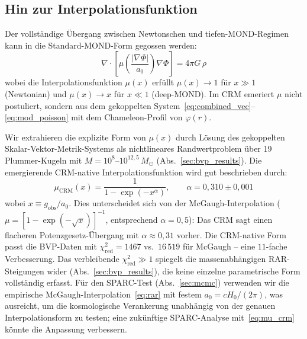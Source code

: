 \documentclass[aps,prd,twocolumn,superscriptaddress,nofootinbib]{revtex4-2}
\begin{document}
\subsection{Hin zur Interpolationsfunktion}
\label{sec:interpolation}

Der vollst\"andige \"Ubergang zwischen Newtonschen und tiefen-MOND-Regimen kann in die Standard-MOND-Form gegossen werden:
\begin{equation}
\nabla\cdot\!\left[\mu\!\left(\frac{|\nabla\Phi|}{a_0}\right)\nabla\Phi\right] = 4\pi G\,\rho
\label{eq:mond_form}
\end{equation}
wobei die Interpolationsfunktion $\mu(x)$ erf\"ullt $\mu(x) \to 1$ f\"ur $x \gg 1$ (Newtonian) und $\mu(x) \to x$ f\"ur $x \ll 1$ (deep-MOND). Im CRM emeriert $\mu$ nicht postuliert, sondern aus dem gekoppelten System~\eqref{eq:combined_vec}--\eqref{eq:mod_poisson} mit dem Chameleon-Profil von $\varphi(r)$.

Wir extrahieren die explizite Form von $\mu(x)$ durch L\"osung des gekoppelten Skalar-Vektor-Metrik-Systems als nichtlineares Randwertproblem \"uber 19 Plummer-Kugeln mit $M = 10^{8}$--$10^{12{,}5}\,M_\odot$ (Abs.~\ref{sec:bvp_results}). Die emergierende CRM-native Interpolationsfunktion wird gut beschrieben durch:
\begin{equation}
\mu_{\mathrm{CRM}}(x) = \frac{1}{1 - \exp(-x^\alpha)}, \qquad \alpha = 0{,}310 \pm 0{,}001
\label{eq:mu_crm}
\end{equation}
wobei $x \equiv g_{\mathrm{obs}}/a_0$. Dies unterscheidet sich von der McGaugh-Interpolation ($\mu = [1 - \exp(-\sqrt{x})]^{-1}$, entsprechend $\alpha = 0{,}5$): Das CRM sagt einen flacheren Potenzgesetz-\"Ubergang mit $\alpha \approx 0{,}31$ vorher. Die CRM-native Form passt die BVP-Daten mit $\chi^2_{\mathrm{red}} = 1467$ vs.\ $16\,519$ f\"ur McGaugh -- eine $11$-fache Verbesserung. Das verbleibende $\chi^2_{\mathrm{red}} \gg 1$ spiegelt die massenabh\"angigen RAR-Steigungen wider (Abs.~\ref{sec:bvp_results}), die keine einzelne parametrische Form vollst\"andig erfasst. F\"ur den SPARC-Test (Abs.~\ref{sec:mcmc}) verwenden wir die empirische McGaugh-Interpolation~\eqref{eq:rar} mit festem $a_0 = cH_0/(2\pi)$, was ausreicht, um die kosmologische Verankerung unabh\"angig von der genauen Interpolationsform zu testen; eine zuk\"unftige SPARC-Analyse mit~\eqref{eq:mu_crm} k\"onnte die Anpassung verbessern.


\end{document}

